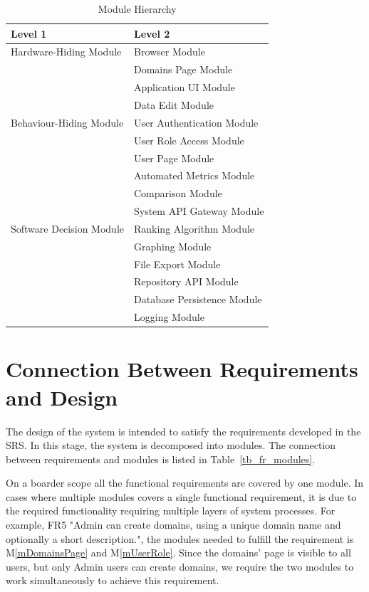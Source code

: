 \documentclass[12pt, titlepage]{article}
\newcommand{\mref}[1]{M\ref{#1}}
\begin{document}
\begin{table}[h!]
\centering
\begin{tabular}{p{} p{}}
\toprule
\textbf{Level 1} & \textbf{Level 2}\\
\midrule

{Hardware-Hiding Module} & Browser Module\\
\midrule
\multirow{7}{0.3\textwidth}{Behaviour-Hiding Module} &  Domains Page Module \\
& Application UI Module \\
& Data Edit Module \\
& User Authentication Module\\
& User Role Access Module\\
& User Page Module \\
& Automated Metrics Module\\
& Comparison Module \\
\midrule

\multirow{3}{0.3\textwidth}{Software Decision Module} & {System API Gateway Module}\\
& Ranking Algorithm Module\\
& Graphing Module\\
& File Export Module\\
& Repository API Module\\
& Database Persistence Module \\
& Logging Module \\
\bottomrule

\end{tabular}
\caption{Module Hierarchy}
\label{TblMH}
\end{table}

\section{Connection Between Requirements and Design} \label{SecConnection}

The design of the system is intended to satisfy the requirements developed in
the SRS. In this stage, the system is decomposed into modules. The connection
between requirements and modules is listed in Table~\ref{tb_fr_modules}.

On a boarder scope all the functional requirements are covered by one module.
In cases where multiple modules covers a single functional requirement, it is due to the required functionality requiring multiple layers of system processes.
For example, FR5 "Admin can create domains, using a unique domain name and optionally a short description.", the modules needed to fulfill the requirement is \mref{mDomainsPage} and \mref{mUserRole}.
Since the domains' page is visible to all users, but only Admin users can create domains, we require the two modules to work simultaneously to achieve this requirement.
\end{document}
